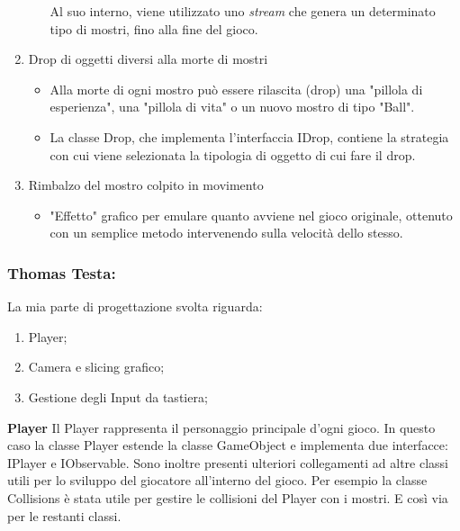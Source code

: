 \documentclass[a4paper,12pt]{report}
\begin{document}
\begin{enumerate}
\begin{itemize}
	Al suo interno, viene utilizzato uno \emph{stream} che genera un determinato tipo di mostri, fino alla fine del gioco. 
\end{itemize}
%
\item Drop di oggetti diversi alla morte di mostri
%
\begin{itemize}
	\item Alla morte di ogni mostro può essere rilascita (drop) una "pillola di esperienza", una "pillola di vita" o un nuovo mostro di tipo "Ball".
	\item La classe Drop, che implementa l'interfaccia IDrop, contiene la strategia con cui viene selezionata la tipologia di oggetto di cui fare il drop.
\end{itemize}

\item Rimbalzo del mostro colpito in movimento
%
\begin{itemize}
	\item "Effetto" grafico per emulare quanto avviene nel gioco originale, ottenuto con un semplice metodo intervenendo sulla velocità dello stesso.
\end{itemize}

\end{enumerate}
%

\subsubsection*{Thomas Testa:}
%
La mia parte di progettazione svolta riguarda:
\begin{enumerate}
    \item Player;
    \item Camera e slicing grafico;
    \item Gestione degli Input da tastiera;
\end{enumerate}

\textbf{Player}
Il Player rappresenta il personaggio principale d'ogni gioco. In questo caso la classe Player estende la classe GameObject e implementa due interfacce: IPlayer e IObservable. Sono inoltre presenti ulteriori collegamenti ad altre classi utili per lo sviluppo del giocatore all'interno del gioco. Per esempio la classe Collisions è stata utile per gestire le collisioni del Player con i mostri. E così via per le restanti classi.
\end{document}
